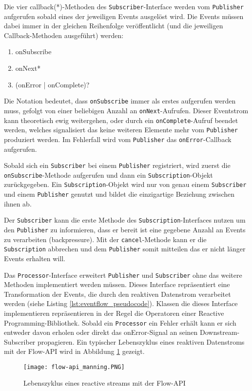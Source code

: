 Die vier \gls{callback}(*)-Methoden des \verb|Subscriber|-Interface werden vom \verb|Publisher| aufgerufen sobald eines der jeweiligen Events ausgelöst wird.
Die Events müssen dabei immer in der gleichen Reihenfolge veröffentlicht (und die jeweiligen Callback-Methoden ausgeführt) werden:
\begin{enumerate}
    \item onSubscribe
    \item onNext*
    \item (onError | onComplete)?
\end{enumerate}
Die Notation bedeutet, dass \verb|onSubscribe| immer als erstes aufgerufen werden muss, gefolgt von einer beliebigen Anzahl an
\verb|onNext|-Aufrufen. Dieser Eventstrom kann theoretisch ewig weitergehen, oder durch ein \verb|onComplete|-Aufruf beendet werden, welches
signalisiert das keine weiteren Elemente mehr vom \verb|Publisher| produziert werden.
Im Fehlerfall wird vom \verb|Publisher| das \verb|onError|-Callback aufgerufen.

Sobald sich ein \verb|Subscriber| bei einem \verb|Publisher| registriert, wird zuerst die \verb|onSubscribe|-Methode aufgerufen und dann ein
\verb|Subscription|-Objekt zurückgegeben. Ein \verb|Subscription|-Objekt wird nur von genau einem \verb|Subscriber| und einem \verb|Publisher| genutzt
und bildet die einzigartige Beziehung zwischen ihnen ab.

Der \verb|Subscriber| kann die erste Methode des \verb|Subscription|-Interfaces nutzen um den \verb|Publisher| zu informieren, dass er bereit
ist eine gegebene Anzahl an Events zu verarbeiten (backpressure). Mit der \verb|cancel|-Methode kann er die \verb|Subscription| abbrechen und dem \verb|Publisher|
somit mitteilen das er nicht länger Events erhalten will.
\parencite{JavaSEFlow}

Das \verb|Processor|-Interface erweitert \verb|Publisher| und \verb|Subscriber| ohne das weitere Methoden implementiert werden müssen.
Dieses Interface repräsentiert eine Transformation der Events, die durch den
reaktiven Datenstrom verarbeitet werden (siehe Listing \ref{lst:eventflow_pseudocode}).
Klassen die dieses Interface implementieren repräsentieren in der Regel die Operatoren einer Reactive Programming-Bibliothek.
Sobald ein \verb|Processor| ein Fehler erhält kann er sich entweder davon erholen oder direkt das onError-Signal an seinen
Downstream-Subscriber propagieren. Ein typischer Lebenszyklus eines reaktiven Datenstroms mit der Flow-API wird in
Abbildung \ref{fig:flow-api} gezeigt.
\begin{figure}[ht!]
    \centering
    \texttt{[image: flow-api\_manning.PNG]}
    \caption{Lebenszyklus eines reactive streams mit der Flow-API \parencite[Kapitel 17,  Figure 17.3]{JavaInAction}}
    \label{fig:flow-api}
\end{figure}
\newpage

